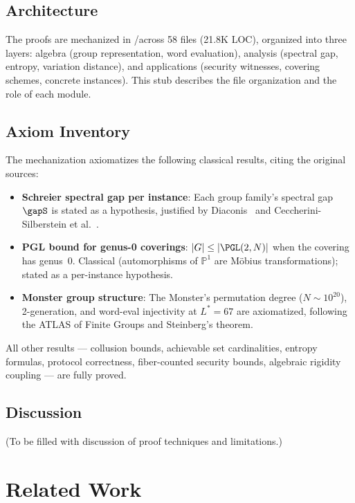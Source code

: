 \documentclass[11pt,a4paper]{article}
\begin{document}
\subsection{Architecture}
\label{sec:arch}

The proofs are mechanized in \Rocq/\MathComp across 58 files (21.8K LOC), organized into three layers: algebra (group representation, word evaluation), analysis (spectral gap, entropy, variation distance), and applications (security witnesses, covering schemes, concrete instances).
This stub describes the file organization and the role of each module.

\subsection{Axiom Inventory}
\label{sec:axioms}

The mechanization axiomatizes the following classical results, citing the original sources:
\begin{itemize}
  \item \textbf{Schreier spectral gap per instance}: Each group family's spectral gap $\gapS$ is stated as a hypothesis, justified by Diaconis~\cite{diaconis1988} and Ceccherini-Silberstein et al.~\cite{ceccheriniSilberstein2008}.
  \item \textbf{PGL bound for genus-0 coverings}: $|G| \leq |\PGL(2,N)|$ when the covering has genus~0. Classical (automorphisms of $\mathbb{P}^1$ are M\"obius transformations); stated as a per-instance hypothesis.
  \item \textbf{Monster group structure}: The Monster's permutation degree ($N \sim 10^{20}$), 2-generation, and word-eval injectivity at $L^* = 67$ are axiomatized, following the ATLAS of Finite Groups and Steinberg's theorem.
\end{itemize}
All other results --- collusion bounds, achievable set cardinalities, entropy formulas, protocol correctness, fiber-counted security bounds, algebraic rigidity coupling --- are fully proved.

\subsection{Discussion}
\label{sec:lessons}

(To be filled with discussion of proof techniques and limitations.)

\section{Related Work}
\label{sec:related}
\end{document}
